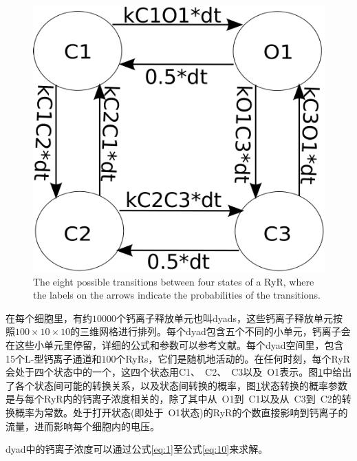  \begin{figure}[ht]
\center
\includegraphics[scale=0.5]{figs/state.pdf}
\caption{The eight possible transitions between four states of a RyR, where the labels on the arrows indicate the
probabilities of the transitions.}
\label{ryrstates}
\end{figure}

在每个细胞里，有约$10000$个钙离子释放单元也叫dyads，这些钙离子释放单元按照$100\times 10\times 10$的三维网格进行排列。每个dyad包含五个不同的小单元，钙离子会在这些小单元里停留，详细的公式和参数可以参考文献。每个dyad空间里，包含15个L-型钙离子通道和$100$个RyRs，它们是随机地活动的。在任何时刻，每个RyR会处于四个状态中的一个，这四个状态用C1、~C2、~C3以及~O1表示。图\ref{ryrstates}中给出了各个状态间可能的转换关系，以及状态间转换的概率，图\ref{ryrstates}状态转换的概率参数是与每个RyR内的钙离子浓度相关的，除了其中从~O1到~C1以及从~C3到~C2的转换概率为常数。处于打开状态(即处于~O1状态)的RyR的个数直接影响到钙离子的流量，进而影响每个细胞内的电压。

dyad中的钙离子浓度可以通过公式\ref{eq:1}至公式\ref{eq:10}来求解。

